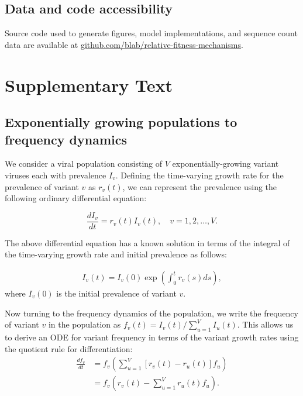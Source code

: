\documentclass[11pt,oneside,letterpaper]{article}
\begin{document}
\subsection*{Data and code accessibility}

Source code used to generate figures, model implementations, and sequence count data are available at \href{https://github.com/blab/relative-fitness-mechanisms}{github.com/blab/relative-fitness-mechanisms}.

\newpage

\section*{Supplementary Text}

\subsection{Exponentially growing populations to frequency dynamics}\label{ssec:frequency_dynamics}

We consider a viral population consisting of $V$ exponentially-growing variant viruses each with prevalence $I_{v}$.
Defining the time-varying growth rate for the prevalence of variant $v$ as $r_{v}(t)$, we can represent the prevalence using the following ordinary differential equation:

\begin{equation} \label{eq:inhomo_exp_growth}
    \frac{d I_{v}}{d t} = r_{v}(t) I_{v}(t), \quad v = 1,2, \ldots, V.
\end{equation}

The above differential equation has a known solution in terms of the integral of the time-varying growth rate and initial prevalence as follows:

\begin{align*}
I_{v}(t) = I_{v}(0) \exp\left( \int_{0}^{t} r_{v}(s) ds\right),
\end{align*}
where $I_{v}(0)$ is the initial prevalence of variant $v$.

Now turning to the frequency dynamics of the population, we write the frequency of variant $v$ in the population as  $f_{v}(t) = I_{v}(t) / \sum_{u=1}^{V} I_{u}(t)$.
This allows us to derive an ODE for variant frequency in terms of the variant growth rates using the quotient rule for differentiation:
\begin{align*}
    \frac{d f_{v}}{d t} &= f_{v} \left( \sum_{u=1}^{V} [r_{v}(t) - r_{u}(t)] f_{u} \right)\\
                        &= f_{v} \left( r_{v}(t) - \sum_{u=1}^{V} r_{u}(t) f_{u} \right).
\end{align*}
\end{document}
